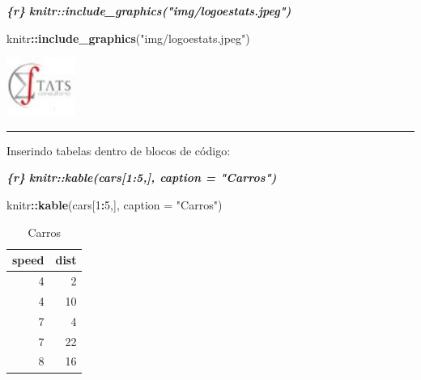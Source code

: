 \documentclass[
]{book}
\newenvironment{Shaded}{\begin{snugshade}}{\end{snugshade}}
\newcommand{\DataTypeTok}[1]{\textcolor[rgb]{0.13,0.29,0.53}{#1}}
\newcommand{\DecValTok}[1]{\textcolor[rgb]{0.00,0.00,0.81}{#1}}
\newcommand{\InformationTok}[1]{\textcolor[rgb]{0.56,0.35,0.01}{\textbf{\textit{#1}}}}
\newcommand{\KeywordTok}[1]{\textcolor[rgb]{0.13,0.29,0.53}{\textbf{#1}}}
\newcommand{\NormalTok}[1]{#1}
\newcommand{\OperatorTok}[1]{\textcolor[rgb]{0.81,0.36,0.00}{\textbf{#1}}}
\newcommand{\StringTok}[1]{\textcolor[rgb]{0.31,0.60,0.02}{#1}}
\begin{document}
\begin{Shaded}
\begin{Highlighting}[]
\InformationTok{\textasciigrave{}\textasciigrave{}\textasciigrave{}\{r\}}
\InformationTok{knitr::include\_graphics("img/logoestats.jpeg")}
\InformationTok{\textasciigrave{}\textasciigrave{}\textasciigrave{}}
\end{Highlighting}
\end{Shaded}

\begin{Shaded}
\begin{Highlighting}[]
\NormalTok{knitr}\OperatorTok{::}\KeywordTok{include\_graphics}\NormalTok{(}\StringTok{"img/logoestats.jpeg"}\NormalTok{)}
\end{Highlighting}
\end{Shaded}

\begin{center}\includegraphics[width=0.89in]{img/logoestats} \end{center}

\begin{center}\rule{0.5\linewidth}{0.5pt}\end{center}

Inserindo tabelas dentro de blocos de código:

\begin{Shaded}
\begin{Highlighting}[]
\InformationTok{\textasciigrave{}\textasciigrave{}\textasciigrave{}\{r\}}
\InformationTok{knitr::kable(cars[1:5,], caption = "Carros")}
\InformationTok{\textasciigrave{}\textasciigrave{}\textasciigrave{}}
\end{Highlighting}
\end{Shaded}

\begin{Shaded}
\begin{Highlighting}[]
\NormalTok{knitr}\OperatorTok{::}\KeywordTok{kable}\NormalTok{(cars[}\DecValTok{1}\OperatorTok{:}\DecValTok{5}\NormalTok{,], }\DataTypeTok{caption =} \StringTok{"Carros"}\NormalTok{)}
\end{Highlighting}
\end{Shaded}

\begin{table}

\caption{\label{tab:unnamed-chunk-32}Carros}
\centering
\begin{tabular}[t]{r|r}
\hline
speed & dist\\
\hline
4 & 2\\
\hline
4 & 10\\
\hline
7 & 4\\
\hline
7 & 22\\
\hline
8 & 16\\
\hline
\end{tabular}
\end{table}
\end{document}
